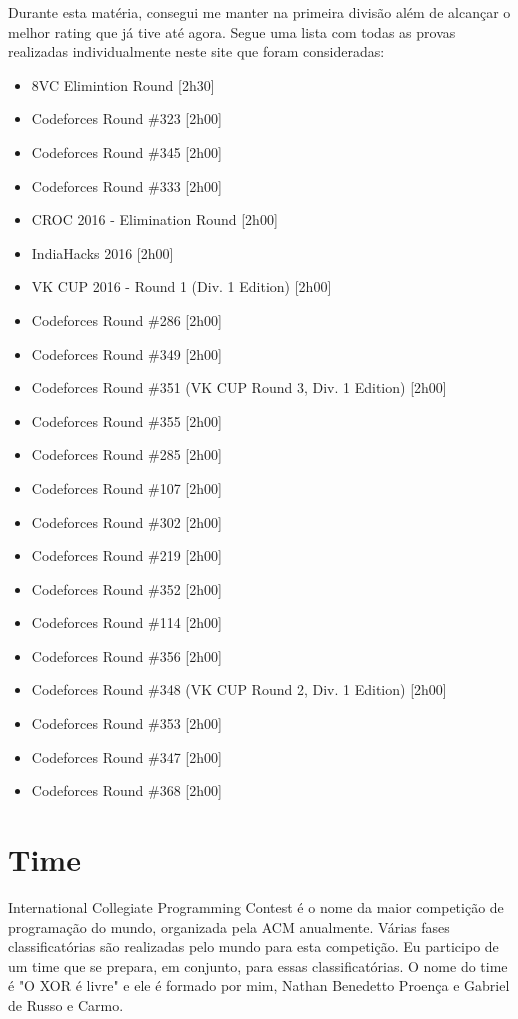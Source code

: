 \documentclass[a4paper, 11pt]{article} %
\begin{document}
Durante esta matéria, consegui me manter na primeira divisão além de alcançar o melhor rating que já tive até agora. Segue uma lista com todas as provas realizadas individualmente neste site que foram consideradas:
\begin{itemize}
    \item 8VC Elimintion Round [2h30]
    \item Codeforces Round \#323 [2h00]
    \item Codeforces Round \#345 [2h00]
    \item Codeforces Round \#333 [2h00]
    \item CROC 2016 - Elimination Round [2h00]
    \item IndiaHacks 2016 [2h00]
    \item VK CUP 2016 - Round 1 (Div. 1 Edition) [2h00]
    \item Codeforces Round \#286 [2h00]
    \item Codeforces Round \#349 [2h00]
    \item Codeforces Round \#351 (VK CUP Round 3, Div. 1 Edition) [2h00]
    \item Codeforces Round \#355 [2h00]
    \item Codeforces Round \#285 [2h00]
    \item Codeforces Round \#107 [2h00]
    \item Codeforces Round \#302 [2h00]
    \item Codeforces Round \#219 [2h00]
    \item Codeforces Round \#352 [2h00]
    \item Codeforces Round \#114 [2h00]
    \item Codeforces Round \#356 [2h00]
    \item Codeforces Round \#348 (VK CUP Round 2, Div. 1 Edition) [2h00]
    \item Codeforces Round \#353 [2h00]
    \item Codeforces Round \#347 [2h00]
    \item Codeforces Round \#368 [2h00]
\end{itemize}


\section*{Time}
International Collegiate Programming Contest é o nome da maior competição de programação do mundo, organizada pela ACM anualmente. Várias fases classificatórias são realizadas pelo mundo para esta competição. Eu participo de um time que se prepara, em conjunto, para essas classificatórias. O nome do time é "O XOR é livre" e ele é formado por mim, Nathan Benedetto Proença e Gabriel de Russo e Carmo.
\end{document}
